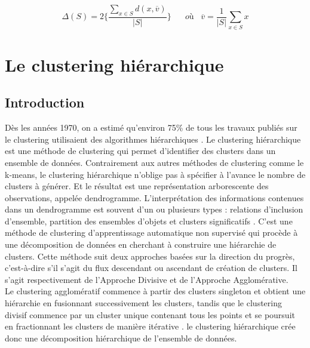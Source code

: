 \begin{equation}
	\Delta (S) = 2  \Bigg \{
	\frac{\sum_{x \in S}d(x,\overline{v})}{\left\lvert S \right\rvert } \Bigg\} 
	\hspace{20pt} où \hspace{10pt} \overline{v} = \frac{1}{\left\lvert S \right\rvert} \sum_{x \in S}x
\end{equation}

\section{Le clustering hiérarchique}
\subsection{Introduction}
Dès les années 1970, on a estimé qu'environ 75\% de tous les travaux publiés sur le clustering utilisaient des algorithmes hiérarchiques \cite{murtagh2012algorithms}. Le clustering hiérarchique est une méthode de clustering qui permet d’identifier des clusters dans un ensemble de données. Contrairement aux autres méthodes de clustering comme le k-means, le clustering hiérarchique n’oblige pas à spécifier à l’avance le nombre de clusters à générer. Et le résultat est une représentation arborescente des observations, appelée dendrogramme. L'interprétation des informations contenues dans un dendrogramme est souvent d'un ou plusieurs types : relations d'inclusion d'ensemble, partition des ensembles d'objets et clusters significatifs \cite{murtagh2012algorithms}. C’est une méthode de clustering d’apprentissage automatique non supervisé qui procède à une décomposition de données en cherchant à construire une hiérarchie de clusters. Cette méthode suit deux approches basées sur la direction du progrès, c'est-à-dire s'il s'agit du flux descendant ou ascendant de création de clusters. Il s'agit respectivement de l'Approche Divisive et de l'Approche Agglomérative. \\
Le clustering agglomératif commence à partir des clusters singleton et obtient une hiérarchie en fusionnant successivement les clusters, tandis que le clustering divisif commence par un cluster unique contenant tous les points et se poursuit en fractionnant les clusters de manière itérative \cite{gurrutxaga2010sep}. le clustering hiérarchique crée donc une décomposition hiérarchique de l'ensemble de données.

